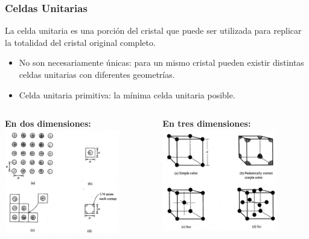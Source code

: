 \documentclass[10pt,t,aspectratio=169]{beamer}
\begin{document}
\begin{frame}[t]
  \frametitle{Celdas Unitarias}
  La celda unitaria es una porción del cristal que puede ser utilizada para replicar la totalidad del cristal original completo.
  \begin{itemize}
    \item No son necesariamente únicas: para un mismo cristal pueden existir distintas celdas unitarias con diferentes geometrías.
    \item Celda unitaria primitiva: la mínima celda unitaria posible.
  \end{itemize}

  \begin{columns}
    \begin{column}[t]{0.5\textwidth}
      \centering
      \textbf{En dos dimensiones:}
      \includegraphics[width=5cm]{./figures/unitcell2d.png}
    \end{column}
    \begin{column}[t]{0.5\textwidth}
      \centering
      \textbf{En tres dimensiones:}
      \includegraphics[width=5cm]{./figures/unitcell3d.png}
    \end{column}
  \end{columns}
\end{frame}
\end{document}
